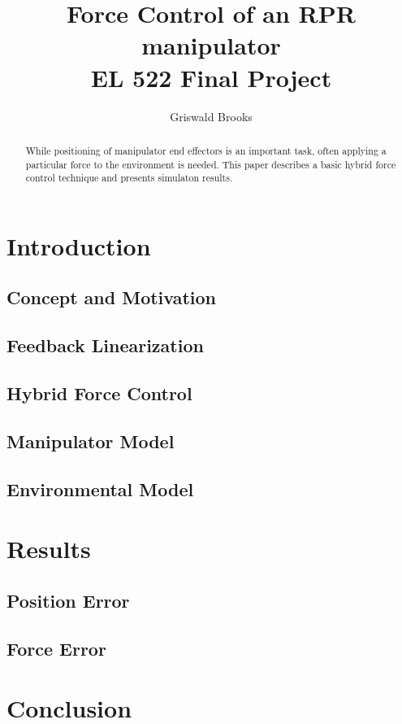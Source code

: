 \documentclass[letterpaper,12pt]{report}
\begin{document}
\title{ Force Control of an RPR manipulator\\EL 522 Final Project}
\author{Griswald Brooks}
\maketitle
 
\begin{abstract}
While positioning of manipulator end effectors is an important task, often applying a particular force to the environment is needed.
This paper describes a basic hybrid force control technique and presents simulaton results.
\end{abstract}

\tableofcontents

\chapter{Introduction}
\section{Concept and Motivation}
\section{Feedback Linearization}
\section{Hybrid Force Control}
\section{Manipulator Model}
\section{Environmental Model}

\chapter{Results}
\section{Position Error}
\section{Force Error}


\chapter{Conclusion}
\end{document}
